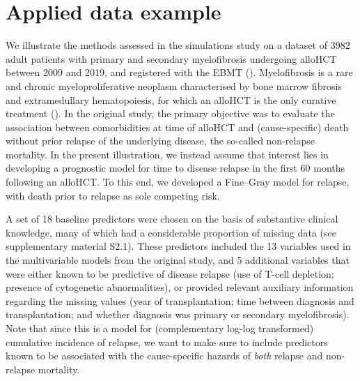 \documentclass[
  letterpaper,
  paper=240mm:170mm,
  twoside=true,
  open=right,
  fontsize=10pt,
  pagesize=false,
  BCOR=15mm,
  DIV=14,
  headinclude=true,
  footinclude=false,
  headsepline=on]{scrbook}
\begin{document}
\section{Applied data example}\label{sec-polverelli}

We illustrate the methods assessed in the simulations study on a dataset
of 3982 adult patients with primary and secondary myelofibrosis
undergoing alloHCT between 2009 and 2019, and registered with the EBMT
(). Myelofibrosis is a rare and chronic
myeloproliferative neoplasm characterised by bone marrow fibrosis and
extramedullary hematopoiesis, for which an alloHCT is the only curative
treatment
(). In the original study, the primary objective was to
evaluate the association between comorbidities at time of alloHCT and
(cause-specific) death without prior relapse of the underlying disease,
the so-called non-relapse mortality. In the present illustration, we
instead assume that interest lies in developing a prognostic model for
time to disease relapse in the first 60 months following an alloHCT. To
this end, we developed a Fine--Gray model for relapse, with death prior
to relapse as sole competing risk.

A set of 18 baseline predictors were chosen on the basis of substantive
clinical knowledge, many of which had a considerable proportion of
missing data (see supplementary material S2.1). These predictors
included the 13 variables used in the multivariable models from the
original study, and 5 additional variables that were either known to be
predictive of disease relapse (use of T-cell depletion; presence of
cytogenetic abnormalities), or provided relevant auxiliary information
regarding the missing values (year of transplantation; time between
diagnosis and transplantation; and whether diagnosis was primary or
secondary myelofibrosis). Note that since this is a model for
(complementary log-log transformed) cumulative incidence of relapse, we
want to make sure to include predictors known to be associated with the
cause-specific hazards of \emph{both} relapse and non-relapse mortality.
\end{document}
